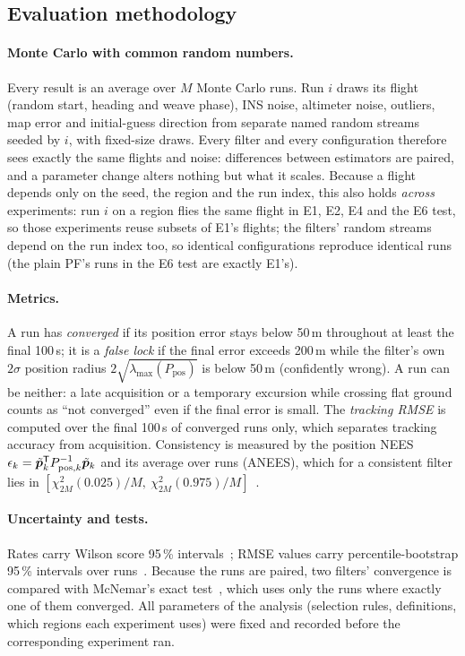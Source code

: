 \subsection{Evaluation methodology}\label{sec:eval}
\paragraph{Monte Carlo with common random numbers.} Every result is an average over $M$ Monte
Carlo runs. Run $i$ draws its flight (random start, heading and weave phase), INS noise,
altimeter noise, outliers, map error and initial-guess direction from separate named random
streams seeded by $i$, with fixed-size draws. Every filter and every configuration therefore
sees exactly the same flights and noise: differences between estimators are paired, and a
parameter change alters nothing but what it scales. Because a flight depends only on the seed,
the region and the run index, this also holds \emph{across} experiments: run $i$ on a region flies
the same flight in E1, E2, E4 and the E6 test, so those experiments reuse subsets of E1's flights;
the filters' random streams depend on the run index too, so identical configurations reproduce
identical runs (the plain PF's runs in the E6 test are exactly E1's).

\paragraph{Metrics.} A run has \emph{converged} if its position error stays below 50\,m
throughout at least the final 100\,s; it is a \emph{false lock} if the final error exceeds
200\,m while the filter's own $2\sigma$ position radius $2\sqrt{\lambda_{\max}(P_{\mathrm{pos}})}$
is below 50\,m (confidently wrong). A run can be neither: a late acquisition or a temporary
excursion while crossing flat ground counts as ``not converged'' even if the final error is
small. The \emph{tracking RMSE} is computed over the final 100\,s of converged runs only, which
separates tracking accuracy from acquisition. Consistency is measured by the position NEES
$\epsilon_k = \tilde{\bm{p}}_k^{\mathsf{T}} P_{\mathrm{pos},k}^{-1}\tilde{\bm{p}}_k$ and its average over runs (ANEES),
which for a consistent filter lies in
$[\chi^2_{2M}(0.025)/M,\ \chi^2_{2M}(0.975)/M]$~\cite{barshalom2001}.

\paragraph{Uncertainty and tests.} Rates carry Wilson score 95\,\% intervals~\cite{wilson1927};
RMSE values carry percentile-bootstrap 95\,\% intervals over runs~\cite{efron1993}. Because the
runs are paired, two filters' convergence is compared with McNemar's exact
test~\cite{mcnemar1947}, which uses only the runs where exactly one of them converged. All
parameters of the analysis (selection rules, definitions, which regions each experiment uses)
were fixed and recorded before the corresponding experiment ran.
